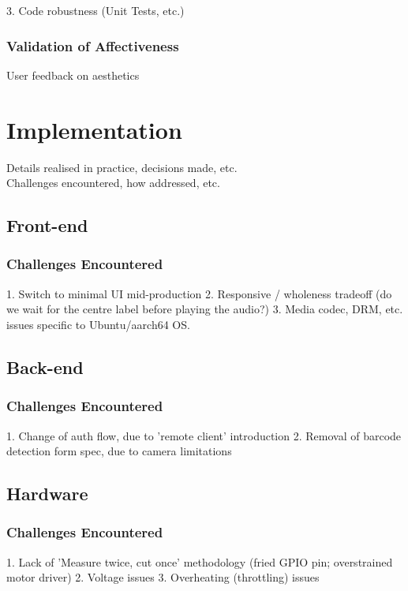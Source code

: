               3. Code robustness (Unit Tests, etc.)
  
          \subsubsection{Validation of Affectiveness}
              User feedback on aesthetics
  
  
  \section{Implementation}
      Details realised in practice, decisions made, etc.\\
      Challenges encountered, how addressed, etc.
      \subsection{Front-end}
          \subsubsection{Challenges Encountered}
              1. Switch to minimal UI mid-production
              2. Responsive / wholeness tradeoff (do we wait for the centre label before playing the audio?)
              3. Media codec, DRM, etc. issues specific to Ubuntu/aarch64 OS.
  
      \subsection{Back-end} %
          \subsubsection{Challenges Encountered}
              1. Change of auth flow, due to 'remote client' introduction
              2. Removal of barcode detection form spec, due to camera limitations
  
      \subsection{Hardware}
          \subsubsection{Challenges Encountered}
              1. Lack of 'Measure twice, cut once' methodology (fried GPIO pin; overstrained motor driver)
              2. Voltage issues
              3. Overheating (throttling) issues
  
